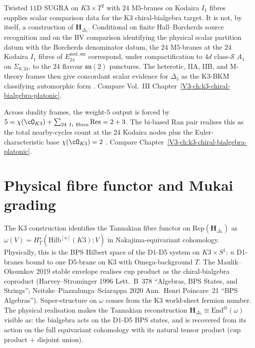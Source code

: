 \begin{remark}
\label{rem:htpo-1}
Twisted $11$D SUGRA on $K3\times T^2$ with $24$ M$5$-branes
on Kodaira $I_1$ fibres supplies scalar comparison data for the K3
chiral-bialgebra target. It is not, by itself, a construction of
$\mathbf H_{\Delta_5}$. Conditional on finite Hall--Borcherds source
recognition and on the BV comparison identifying the physical scalar
partition datum with the Borcherds denominator datum, the $24$
M$5$-branes at the $24$ Kodaira $I_1$ fibres of
$E^{\mathrm{nod,sm}}_{24}$ correspond, under compactification to $4d$
class-$\mathcal S$ $A_1$ on $\Sigma_{0,24}$, to the $24$ flavour
$\mathfrak{su}(2)$ punctures. The heterotic, IIA, IIB, and M-theory
frames then give concordant scalar evidence for $\Delta_5$ as the
K3-BKM classifying automorphic form
\cite{EguchiOoguriTachikawa2010,Gaiotto2009}. Compare Vol.~III
Chapter~\ref{V3-ch:k3-chiral-bialgebra-platonic}.
\end{remark}

\begin{remark}
\label{rem:htpo-2}
Across duality frames, the weight-$5$ output is forced by
$5 = \chi(\cO_{K3}) + \sum_{24\ I_1\text{ fibres}}\mathrm{Res} = 2 + 3$.
The bi-based Ran pair realises this as the total nearby-cycles count
at the $24$ Kodaira nodes plus the Euler-characteristic base
$\chi(\cO_{K3}) = 2$ \cite{KugaSatake1967,Borcherds1992}. Compare
Chapter~\ref{V3-ch:k3-chiral-bialgebra-platonic}.
\end{remark}

\section{Physical fibre functor and Mukai grading}
\label{sec:htpo-supplement-ii}

\begin{remark}
\label{rem:htpo-physical-omega}
The K3 construction identifies the Tannakian fibre functor on
$\mathrm{Rep}(\mathbf H_{\Delta_5})$ as
$\omega(V) = H^\star_T(\mathrm{Hilb}^{[n]}(K3); V)$ in
Nakajima-equivariant cohomology. Physically, this is the BPS
Hilbert space of the D1-D5 system on $K3 \times S^1$:
$n$ D1-branes bound to one D5-brane on K3 with Omega-background $T$.
The Maulik--Okounkov 2019 stable envelope realises cup product as
the chiral-bialgebra coproduct (Harvey--Strominger 1996 Lett.~B~378
``Algebras, BPS States, and Strings''; Neitzke--Piazzalunga--Sciarappa
2020 Ann.~Henri Poincare~21 ``BPS Algebras''). Super-structure on
$\omega$ comes from the K3 world-sheet fermion number. The physical
realisation makes the Tannakian reconstruction
$\mathbf H_{\Delta_5} \cong \mathrm{End}^\otimes(\omega)$ visible as:
the bialgebra acts on the D1-D5 BPS states, and is recovered from
its action on the full equivariant cohomology with its natural
tensor product (cup product + disjoint union).
\end{remark}

